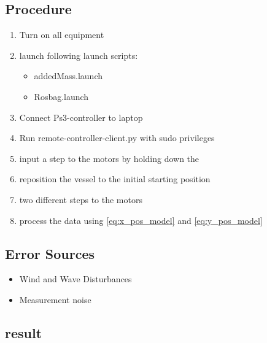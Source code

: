 \subsection{Procedure}
\begin{enumerate}
	\item Turn on all equipment
	\item launch following launch scripts:
		\begin{itemize}
			\item addedMass.launch 
			\item Rosbag.launch 
		\end{itemize}
	\item Connect Ps3-controller to laptop
	\item Run remote-controller-client.py with sudo privileges
	\item input a step to the motors by holding down the 
	\item reposition the vessel to the initial starting position
	\item two different steps to the motors
\item process the data using \autoref{eq:x_pos_model} and \autoref{eq:y_pos_model}
\end{enumerate}


\subsection{Error Sources}
\begin{itemize}
	\item Wind and Wave Disturbances
	\item Measurement noise
\end{itemize}

\subsection{result}
